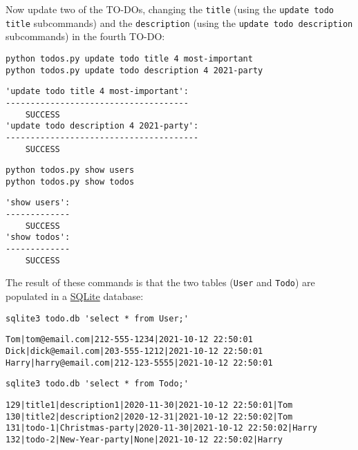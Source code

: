 \documentclass[10pt]{amsart}
\numberwithin{equation}{section}
\begin{document}
Now update two of the TO-DOs, changing the \texttt{title} (using the \texttt{update todo
title} subcommands) and the \texttt{description} (using the \texttt{update todo description}
subcommands) in the fourth TO-DO:
\begin{verbatim}
python todos.py update todo title 4 most-important
python todos.py update todo description 4 2021-party
\end{verbatim}

\begin{verbatim}
'update todo title 4 most-important':
-------------------------------------
	SUCCESS
'update todo description 4 2021-party':
---------------------------------------
	SUCCESS
\end{verbatim}


\begin{verbatim}
python todos.py show users
python todos.py show todos
\end{verbatim}

\begin{verbatim}
'show users':
-------------
	SUCCESS
'show todos':
-------------
	SUCCESS
\end{verbatim}


The result of these commands is that the two tables (\texttt{User} and \texttt{Todo})
are populated in a \href{https://www.sqlite.org/index.html}{SQLite} database:
\begin{verbatim}
sqlite3 todo.db 'select * from User;'
\end{verbatim}

\begin{verbatim}
Tom|tom@email.com|212-555-1234|2021-10-12 22:50:01
Dick|dick@email.com|203-555-1212|2021-10-12 22:50:01
Harry|harry@email.com|212-123-5555|2021-10-12 22:50:01
\end{verbatim}


\begin{verbatim}
sqlite3 todo.db 'select * from Todo;'
\end{verbatim}

\begin{verbatim}
129|title1|description1|2020-11-30|2021-10-12 22:50:01|Tom
130|title2|description2|2020-12-31|2021-10-12 22:50:02|Tom
131|todo-1|Christmas-party|2020-11-30|2021-10-12 22:50:02|Harry
132|todo-2|New-Year-party|None|2021-10-12 22:50:02|Harry
\end{verbatim}
\end{document}

